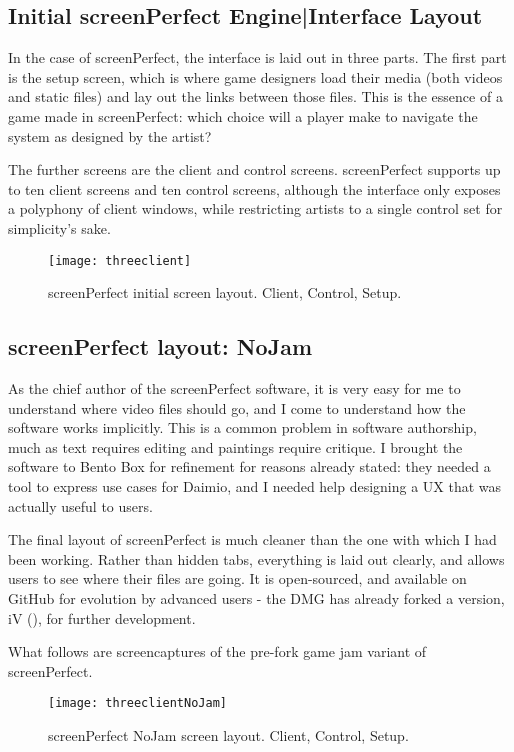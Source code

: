 \subsection{Initial screenPerfect Engine|Interface Layout}
In the case of screenPerfect, the interface is laid out in three parts. The first part is the setup screen, which is where game designers load their media (both videos and static files) and lay out the links between those files. This is the essence of a game made in screenPerfect: which choice will a player make to navigate the system as designed by the artist?

The further screens are the client and control screens. screenPerfect supports up to ten client screens and ten control screens, although the interface only exposes a polyphony of client windows, while restricting artists to a single control set for simplicity's sake.

\begin{figure}[h]
  \caption{screenPerfect initial screen layout. Client, Control, Setup.}
  \centering
    \texttt{[image: threeclient]}
\end{figure}

\subsection{screenPerfect layout: NoJam}

As the chief author of the screenPerfect software, it is very easy for me to understand where video files should go, and I come to understand how the software works implicitly. This is a common problem in software authorship, much as text requires editing and paintings require critique. I brought the software to Bento Box for refinement for reasons already stated: they needed a tool to express use cases for Daimio, and I needed help designing a UX that was actually useful to users.

The final layout of screenPerfect is much cleaner than the one with which I had been working. Rather than hidden tabs, everything is laid out clearly, and allows users to see where their files are going. It is open-sourced, and available on GitHub for evolution by advanced users - the DMG has already forked a version, iV (\parencite{daimio}), for further development.

What follows are screencaptures of the pre-fork game jam variant of screenPerfect.

\begin{figure}[h]
  \caption{screenPerfect NoJam screen layout. Client, Control, Setup.}
  \centering
    \texttt{[image: threeclientNoJam]}
\end{figure}

